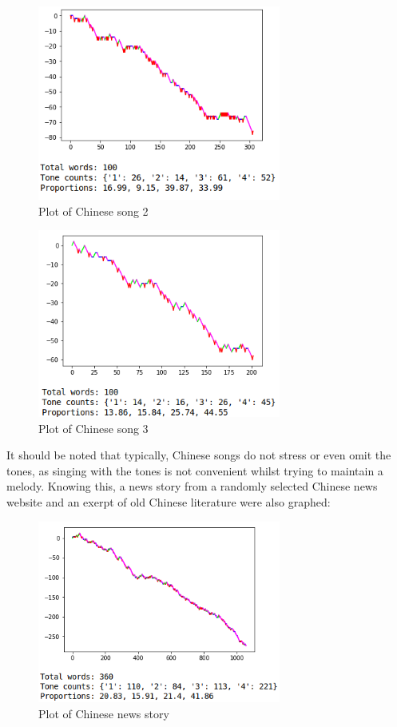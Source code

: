 \documentclass[11pt, a4paper]{article}
\begin{document}
    \begin{figure}[H]
      \includegraphics[width=8cm]{lsadm}
      \centering
      \caption{Plot of Chinese song 2}
    \end{figure}

    \begin{figure}[H]
      \includegraphics[width=8cm]{tmm}
      \centering
      \caption{Plot of Chinese song 3}
    \end{figure}

    It should be noted that typically, Chinese songs do not stress or even omit the tones, as singing with the tones is not convenient whilst trying to maintain a melody. Knowing this, a news story from a randomly selected Chinese news website and an exerpt of old Chinese literature were also graphed:

    \begin{figure}[H]
      \includegraphics[width=8cm]{cn_news}
      \centering
      \caption{Plot of Chinese news story}
    \end{figure}
\end{document}

